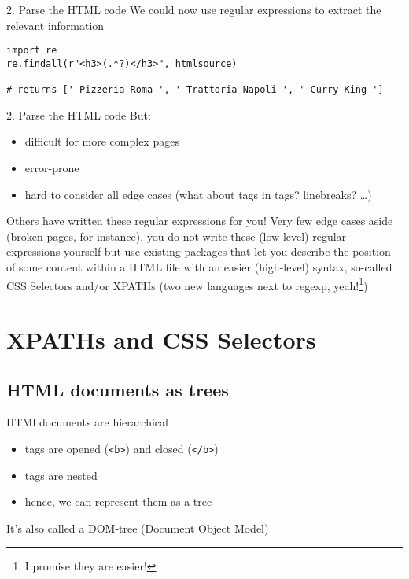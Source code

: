 \begin{frame}[fragile]{2. Parse the HTML code}
We could now use regular expressions to extract the relevant information
\pause
\begin{verbatim}
import re    
re.findall(r"<h3>(.*?)</h3>", htmlsource)

# returns [' Pizzeria Roma ', ' Trattoria Napoli ', ' Curry King ']
\end{verbatim}
\end{frame}

\begin{frame}{2. Parse the HTML code}
  But:
  \begin{itemize}
  \item difficult for more complex pages
  \item error-prone
  \item hard to consider all edge cases (what about tags in tags? linebreaks? \ldots)
  \end{itemize}

  \pause

  \begin{alertblock}{Others have written these regular expressions for you!}
Very few edge cases aside (broken pages, for instance), you do not write these (low-level) regular expressions yourself but use existing packages that let you describe the position of some content within a HTML file with an easier (high-level) syntax, so-called CSS Selectors and/or XPATHs (two new languages next to regexp, yeah!\footnote{I promise they are easier!})
\end{alertblock}


\end{frame}





\section{XPATHs and CSS Selectors}

\subsection{HTML documents as trees}

\begin{frame}{HTMl documents are hierarchical}
  \begin{itemize}
  \item tags are opened (\texttt{<b>}) and closed  (\texttt{</b>})
  \item tags are nested
  \item hence, we can represent them as a tree
  \end{itemize}
\footnotesize{It's also called a DOM-tree (Document Object Model)}
\end{frame}

